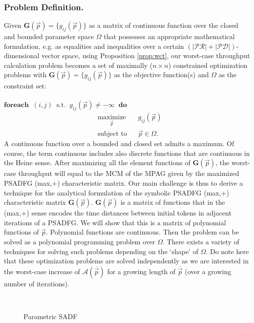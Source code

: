 \documentclass[]{eptcs}
\begin{document}
\subsubsection{Problem Definition.}
Given $\mathbf{G}(\vec{p})=\{g_{ij}(\vec{p})\}$ as a matrix of continuous function over the closed and bounded parameter space $\Omega$ that possesses an appropriate mathematical formulation, e.g. as equalities and inequalities over a certain $\left( |\mathcal{PR}| + |\mathcal{PD}| \right)$-dimensional vector space, using Proposition \ref{prop:wct}, our worst-case throughput calculation problem becomes a set of maximally ($n\times n$) constrained optimization problems with $\mathbf{G}(\vec{p})=\{g_{ij}(\vec{p})\}$ as the objective function(s) and $\Omega$ as the constraint set:
\\\\
$\textbf{foreach} \;\; (i,j) \;\; \mbox{s.t.} \;\; g_{ij}(\vec{p})\ne -\infty \;\; \textbf{do}$
\begin{equation*}
\begin{aligned}
& \underset{\vec{p}}{\mbox{maximize}}
& & g_{ij}(\vec{p}) \\
&\mbox{subject to} 
& & \vec{p} \in \Omega.
\end{aligned}
\end{equation*}
A continuous function over a bounded and closed set admits a maximum. Of course, the term continuous includes also discrete functions that are continuous in the Heine sense. After maximizing all the element functions of $\mathbf{G}(\vec{p})$, the worst-case throughput will equal to the MCM of the MPAG given by the maximized PSADFG (max,+) characteristic matrix. Our main challenge is thus to derive a technique for the analytical formulation of the symbolic PSADFG (max,+) characteristic matrix $\mathbf{G}(\vec{p})$. $\mathbf{G}(\vec{p})$ is a matrix of functions that in the (max,+) sense encodes the time distances between initial tokens in adjacent iterations of a PSADFG. We will show that this is a matrix of polynomial functions of $\vec{p}$. Polynomial functions are continuous. Then the problem can be solved as a polynomial programming problem over $\Omega$. There exists a variety of techniques for solving such problems depending on the `shape' of $\Omega$. Do note here that these optimization problems are solved independently as we are interested in the worst-case increase of $\mathcal{A}(\overline{\vec{p}})$ for a growing length of $\overline{\vec{p}}$ (over a growing number of iterations).
\begin{figure}[t]\centering
	~~~~~~~~~~~~~~~
	\caption{Parametric SADF}\label{fig:psadf}\end{figure}
\end{document}
